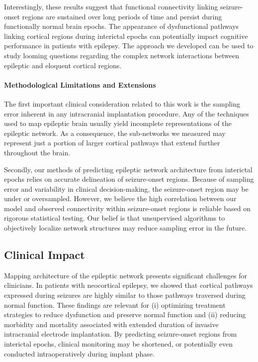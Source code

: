 Interestingly, these results suggest that functional connectivity linking seizure-onset regions are sustained over long periods of time and persist during functionally normal brain epochs. The appearance of dysfunctional pathways linking cortical regions during interictal epochs can potentially impact cognitive performance in patients with epilepsy. The approach we developed can be used to study looming questions regarding the complex network interactions between epileptic and eloquent cortical regions.

\paragraph{Methodological Limitations and Extensions}
The first important clinical consideration related to this work is the sampling error inherent in any intracranial implantation procedure. Any of the techniques used to map epileptic brain usually yield incomplete representations of the epileptic network. As a consequence, the sub-networks we measured may represent just a portion of larger cortical pathways that extend further throughout the brain.

Secondly, our methods of predicting epileptic network architecture from interictal epochs relies on accurate delineation of seizure-onset regions. Because of sampling error and variability in clinical decision-making, the seizure-onset region may be under or oversampled. However, we believe the high correlation between our model and observed connectivity within seizure-onset regions is reliable based on rigorous statistical testing. Our belief is that unsupervised algorithms to objectively localize network structures may reduce sampling error in the future. 

\subsection{Clinical Impact}
Mapping architecture of the epileptic network presents significant challenges for clinicians. In patients with neocortical epilepsy, we showed that cortical pathways expressed during seizures are highly similar to those pathways traversed during normal function. These findings are relevant for (i) optimizing treatment strategies to reduce dysfunction and preserve normal function and (ii) reducing morbidity and mortality associated with extended duration of invasive intracranial electrode implantation. By predicting seizure-onset regions from interictal epochs, clinical monitoring may be shortened, or potentially even conducted intraoperatively during implant phase. 

